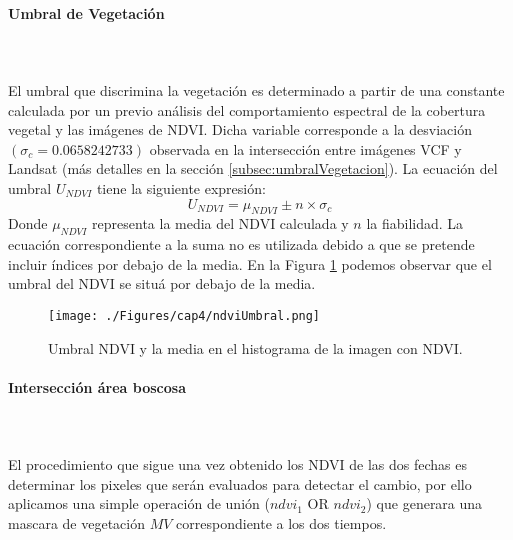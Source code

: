 \paragraph{Umbral de Vegetaci\'on}\label{sec:uvegetacion}\mbox{}\\\mbox{}\\
El umbral que discrimina la vegetaci\'on es determinado a partir de una constante calculada por un previo an\'alisis del comportamiento espectral de la cobertura vegetal y las im\'agenes de NDVI. Dicha variable corresponde a la desviaci\'on $(\sigma_{c} = 0.0658242733)  $ observada en la intersecci\'on entre im\'agenes VCF y Landsat (m\'as detalles en la secci\'on \ref{subsec:umbralVegetacion}). La ecuaci\'on del umbral $ U_{NDVI} $ tiene la siguiente expresi\'on:
		\begin{equation}
		U_{NDVI} = \mu_{NDVI}\pm n \times \sigma_{c}
		\end{equation}
Donde $ \mu_{NDVI} $ representa la media del NDVI calculada y $ n $ la fiabilidad. La ecuaci\'on correspondiente a la suma no es utilizada debido a que se pretende incluir \'indices por debajo de la media. En la Figura \ref{fig:ndviUmbral} podemos observar que el umbral del NDVI se situ\'a por debajo de la media.
\begin{figure}[H]
	\centering
	\texttt{[image: ./Figures/cap4/ndviUmbral.png]}
	\caption{Umbral NDVI y la media en el histograma de la imagen con NDVI.}
	\label{fig:ndviUmbral}
\end{figure}

\paragraph{Intersecci\'on \'area boscosa }\mbox{}\\\mbox{}\\
El procedimiento que sigue una vez obtenido los NDVI de las dos fechas es determinar los pixeles que ser\'an evaluados para detectar el cambio, por ello aplicamos una simple operaci\'on de uni\'on ($ ndvi_{1} $ OR $ ndvi_{2}$) que generara una mascara de vegetaci\'on $ MV $ correspondiente a los dos tiempos.

